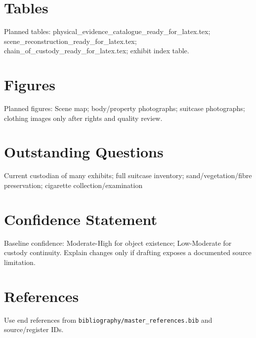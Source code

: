 \section{Tables}
Planned tables: physical_evidence_catalogue_ready_for_latex.tex; scene_reconstruction_ready_for_latex.tex; chain_of_custody_ready_for_latex.tex; exhibit index table.

\section{Figures}
Planned figures: Scene map; body/property photographs; suitcase photographs; clothing images only after rights and quality review.

\section{Outstanding Questions}
Current custodian of many exhibits; full suitcase inventory; sand/vegetation/fibre preservation; cigarette collection/examination

\section{Confidence Statement}
Baseline confidence: Moderate-High for object existence; Low-Moderate for custody continuity. Explain changes only if drafting exposes a documented source limitation.

\section{References}
Use end references from \texttt{bibliography/master_references.bib} and source/register IDs.
